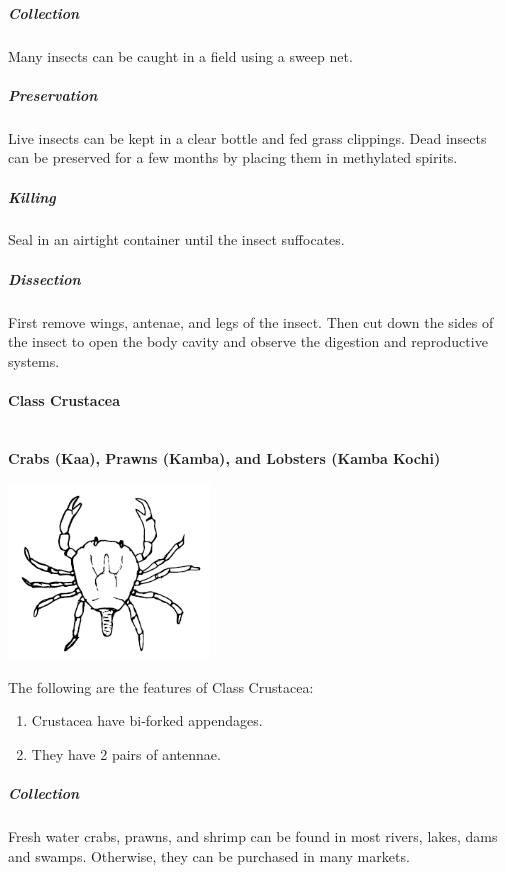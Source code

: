 \begin{multicols}{2}
\subparagraph{Collection}
Many insects can be caught in a field using a sweep net. 

\subparagraph{Preservation} 
Live insects can be kept in a clear bottle and fed grass clippings. Dead insects can be preserved for a few months by placing them in methylated spirits.

\subparagraph{Killing}
Seal in an airtight container until the insect suffocates.

\subparagraph{Dissection}
First remove wings, antenae, and legs of the insect. Then cut down the sides of the insect to open the body cavity and observe the digestion and reproductive systems.
	
\paragraph{Class Crustacea}\hfill \\
\textbf{Crabs (Kaa), Prawns (Kamba), and Lobsters (Kamba Kochi)}

\begin{center}
\includegraphics[width=0.4\textwidth]{./img/crab.png}
\end{center}

The following are the features of Class Crustacea:
\begin{enumerate}
\item{Crustacea have bi-forked appendages.}
\item{They have 2 pairs of antennae.}
\end{enumerate}

%

\subparagraph{Collection}
Fresh water crabs, prawns, and shrimp can be found in most rivers, lakes, dams and swamps. Otherwise, they can be purchased in many markets.



\end{multicols}
